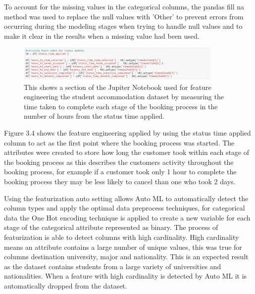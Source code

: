 To account for the missing values in the categorical columns, the pandas fill na method was used to replace the null values with 'Other'  to prevent errors from occurring during the modeling stages when trying to handle null values and to make it clear in the results when a missing value had been used.

\begin{figure}[H]
 \centering
 \includegraphics[width=10cm]{figures/time_variables.png}
 \caption{This shows a section of the Jupiter Notebook used for feature engineering the student accommodation dataset by measuring the time taken to complete each stage of the booking process in the number of hours from the status time applied.}
\end{figure}
Figure 3.4 shows the feature engineering applied by using the status time applied column to act as the first point where the booking process was started. The attributes were created to store how long the customer took within each stage of the booking process as this describes the customers activity throughout the booking process, for example if a customer took only 1 hour to complete the booking process they may be less likely to cancel than one who took 2 days. 

\vspace{5mm}

Using the featurization auto setting allows Auto ML to automatically detect the column types and apply the optimal data preprocess techniques, for categorical data the One Hot encoding technique is applied to create a new variable for each stage of the categorical attribute represented as binary. The process of featurization is able to detect columns with high cardinality.  High cardinality means an attribute contains a large number of unique values, this was true for columns destination university, major and nationality. This is an expected result as the dataset contains students from a large variety of universities and nationalities. When a feature with high cardinality is detected by Auto ML it is automatically dropped from the dataset. 

\vspace{5mm}

